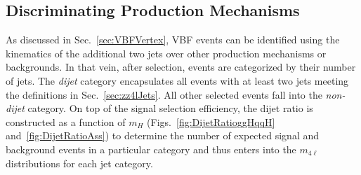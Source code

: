 \subsection{Discriminating Production Mechanisms}
\label{sec:ZZ4lDjet}

As discussed in Sec.~\ref{sec:VBFVertex}, VBF events can be identified using the kinematics of the additional two jets over other production mechanisms or backgrounds. In that vein, after selection, events are categorized by their number of jets. The \textit{dijet} category encapsulates all events with at least two jets meeting the definitions in Sec.~\ref{sec:zz4lJets}. All other selected events fall into the \textit{non-dijet} category. On top of the signal selection efficiency, the dijet ratio is constructed as a function of $m_H$ (Figs.~\ref{fig:DijetRatioggHqqH} and~\ref{fig:DijetRatioAss}) to determine the number of expected signal and background events in a particular category and thus enters into the $m_{4\ell}$ distributions for each jet category.


